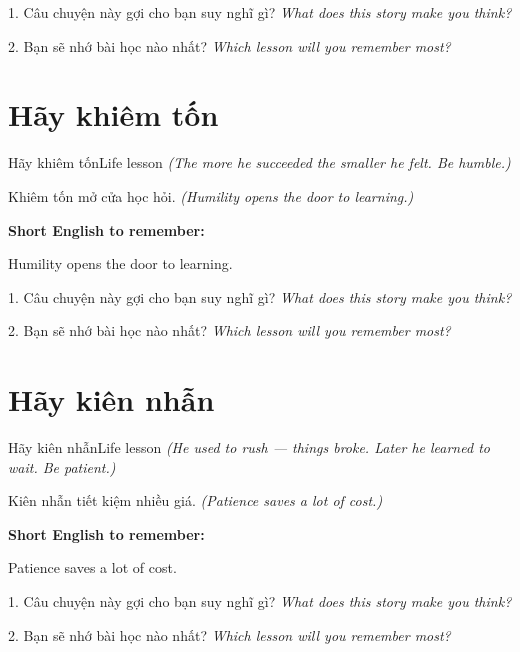 \begin{tuhocnhanh}
1. Câu chuyện này gợi cho bạn suy nghĩ gì? \textit{What does this story make you think?}

2. Bạn sẽ nhớ bài học nào nhất? \textit{Which lesson will you remember most?}
\end{tuhocnhanh}
\ngancach


\section{Hãy khiêm tốn}
\begin{truyen}{Hãy khiêm tốn}{Life lesson}
\textit{(The more he succeeded the smaller he felt. Be humble.)}
\end{truyen}

\begin{baihoc}
Khiêm tốn mở cửa học hỏi.
\textit{(Humility opens the door to learning.)}
\end{baihoc}

\begin{ghinhoanh}
\textbf{Short English to remember:}

Humility opens the door to learning.

\end{ghinhoanh}

\begin{tuhocnhanh}
1. Câu chuyện này gợi cho bạn suy nghĩ gì? \textit{What does this story make you think?}

2. Bạn sẽ nhớ bài học nào nhất? \textit{Which lesson will you remember most?}
\end{tuhocnhanh}
\ngancach


\section{Hãy kiên nhẫn}
\begin{truyen}{Hãy kiên nhẫn}{Life lesson}
\textit{(He used to rush — things broke. Later he learned to wait. Be patient.)}
\end{truyen}

\begin{baihoc}
Kiên nhẫn tiết kiệm nhiều giá.
\textit{(Patience saves a lot of cost.)}
\end{baihoc}

\begin{ghinhoanh}
\textbf{Short English to remember:}

Patience saves a lot of cost.

\end{ghinhoanh}

\begin{tuhocnhanh}
1. Câu chuyện này gợi cho bạn suy nghĩ gì? \textit{What does this story make you think?}

2. Bạn sẽ nhớ bài học nào nhất? \textit{Which lesson will you remember most?}
\end{tuhocnhanh}
\ngancach
